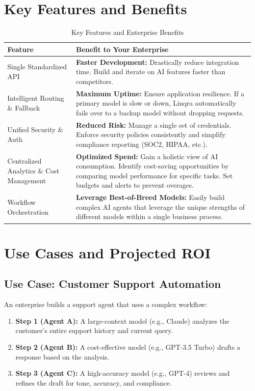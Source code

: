 \documentclass[11pt,a4paper]{article}
\begin{document}
\newpage
\section{Key Features and Benefits}
\begin{table}[H]
\centering
\renewcommand{\arraystretch}{1.3}
\setlength{\tabcolsep}{8pt}
\begin{tabular}{p{} p{}}
\toprule
\textbf{Feature} & \textbf{Benefit to Your Enterprise} \\
\midrule
Single Standardized API & \textbf{Faster Development:} Drastically reduce integration time. Build and iterate on AI features faster than competitors. \\
Intelligent Routing \& Fallback & \textbf{Maximum Uptime:} Ensure application resilience. If a primary model is slow or down, Linqra automatically fails over to a backup model without dropping requests. \\
Unified Security \& Auth & \textbf{Reduced Risk:} Manage a single set of credentials. Enforce security policies consistently and simplify compliance reporting (SOC2, HIPAA, etc.). \\
Centralized Analytics \& Cost Management & \textbf{Optimized Spend:} Gain a holistic view of AI consumption. Identify cost-saving opportunities by comparing model performance for specific tasks. Set budgets and alerts to prevent overages. \\
Workflow Orchestration & \textbf{Leverage Best-of-Breed Models:} Easily build complex AI agents that leverage the unique strengths of different models within a single business process. \\
\bottomrule
\end{tabular}
\caption{Key Features and Enterprise Benefits}
\end{table}

\newpage
\section{Use Cases and Projected ROI}
\subsection{Use Case: Customer Support Automation}
An enterprise builds a support agent that uses a complex workflow:

\begin{enumerate}[leftmargin=*]
  \item \textbf{Step 1 (Agent A):} A large-context model (e.g., Claude) analyzes the customer's entire support history and current query.
  \item \textbf{Step 2 (Agent B):} A cost-effective model (e.g., GPT-3.5 Turbo) drafts a response based on the analysis.
  \item \textbf{Step 3 (Agent C):} A high-accuracy model (e.g., GPT-4) reviews and refines the draft for tone, accuracy, and compliance.
\end{enumerate}
\end{document}
